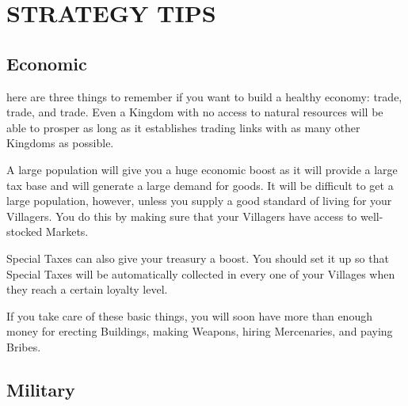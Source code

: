 
\chapter[Strategy Tips]{\textsf{{\Huge S}TRATEGY {\Huge T}IPS}}


\section{\textsf{Economic}}


here are three things to remember if you want to build a healthy economy: trade, trade, and trade. Even a Kingdom with no access to natural resources will be able to prosper as long as it establishes trading links with as many other Kingdoms as possible.

A large population will give you a huge economic boost as it will provide a large tax base and will generate a large demand for goods. It will be difficult to get a large population, however, unless you supply a good standard of living for your Villagers. You do this by making sure that your Villagers have access to well-stocked Markets.

Special Taxes can also give your treasury a boost. You should set it up so that Special Taxes will be automatically collected in every one of your Villages when they reach a certain loyalty level.

If you take care of these basic things, you will soon have more than enough money for erecting Buildings, making Weapons, hiring Mercenaries, and paying Bribes.

\section{\textsf{Military}}

